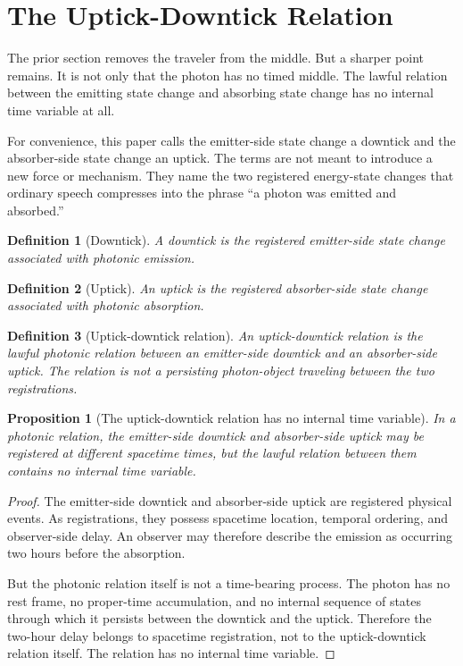 \documentclass[12pt,onecolumn]{article}
\newtheorem{proposition}{Proposition}
\newtheorem{definition}{Definition}
\begin{document}
\section{The Uptick-Downtick Relation}

The prior section removes the traveler from the middle. But a sharper point remains. It is not only that the photon has no timed middle. The lawful relation between the emitting state change and absorbing state change has no internal time variable at all.

For convenience, this paper calls the emitter-side state change a downtick and the absorber-side state change an uptick. The terms are not meant to introduce a new force or mechanism. They name the two registered energy-state changes that ordinary speech compresses into the phrase ``a photon was emitted and absorbed.''

\begin{definition}[Downtick]
A downtick is the registered emitter-side state change associated with photonic emission.
\end{definition}

\begin{definition}[Uptick]
An uptick is the registered absorber-side state change associated with photonic absorption.
\end{definition}

\begin{definition}[Uptick-downtick relation]
An uptick-downtick relation is the lawful photonic relation between an emitter-side downtick and an absorber-side uptick. The relation is not a persisting photon-object traveling between the two registrations.
\end{definition}

\begin{proposition}[The uptick-downtick relation has no internal time variable]
In a photonic relation, the emitter-side downtick and absorber-side uptick may be registered at different spacetime times, but the lawful relation between them contains no internal time variable.
\end{proposition}

\begin{proof}
The emitter-side downtick and absorber-side uptick are registered physical events. As registrations, they possess spacetime location, temporal ordering, and observer-side delay. An observer may therefore describe the emission as occurring two hours before the absorption.

But the photonic relation itself is not a time-bearing process. The photon has no rest frame, no proper-time accumulation, and no internal sequence of states through which it persists between the downtick and the uptick. Therefore the two-hour delay belongs to spacetime registration, not to the uptick-downtick relation itself. The relation has no internal time variable.
\end{proof}
\end{document}
